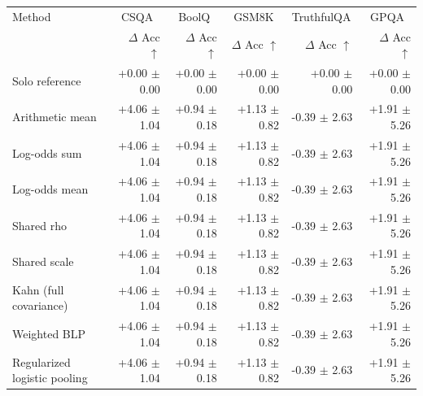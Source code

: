 \begin{tabular}{lrrrrr}
\toprule
Method & \multicolumn{1}{c}{CSQA} & \multicolumn{1}{c}{BoolQ} & \multicolumn{1}{c}{GSM8K} & \multicolumn{1}{c}{TruthfulQA} & \multicolumn{1}{c}{GPQA} \\
 & $\Delta$ Acc $\uparrow$ & $\Delta$ Acc $\uparrow$ & $\Delta$ Acc $\uparrow$ & $\Delta$ Acc $\uparrow$ & $\Delta$ Acc $\uparrow$ \\
\midrule
Solo reference & +0.00 {\scriptsize $\pm$ 0.00} & +0.00 {\scriptsize $\pm$ 0.00} & +0.00 {\scriptsize $\pm$ 0.00} & +0.00 {\scriptsize $\pm$ 0.00} & +0.00 {\scriptsize $\pm$ 0.00} \\
Arithmetic mean & +4.06 {\scriptsize $\pm$ 1.04} & +0.94 {\scriptsize $\pm$ 0.18} & +1.13 {\scriptsize $\pm$ 0.82} & -0.39 {\scriptsize $\pm$ 2.63} & +1.91 {\scriptsize $\pm$ 5.26} \\
Log-odds sum & +4.06 {\scriptsize $\pm$ 1.04} & +0.94 {\scriptsize $\pm$ 0.18} & +1.13 {\scriptsize $\pm$ 0.82} & -0.39 {\scriptsize $\pm$ 2.63} & +1.91 {\scriptsize $\pm$ 5.26} \\
Log-odds mean & +4.06 {\scriptsize $\pm$ 1.04} & +0.94 {\scriptsize $\pm$ 0.18} & +1.13 {\scriptsize $\pm$ 0.82} & -0.39 {\scriptsize $\pm$ 2.63} & +1.91 {\scriptsize $\pm$ 5.26} \\
Shared rho & +4.06 {\scriptsize $\pm$ 1.04} & +0.94 {\scriptsize $\pm$ 0.18} & +1.13 {\scriptsize $\pm$ 0.82} & -0.39 {\scriptsize $\pm$ 2.63} & +1.91 {\scriptsize $\pm$ 5.26} \\
Shared scale & +4.06 {\scriptsize $\pm$ 1.04} & +0.94 {\scriptsize $\pm$ 0.18} & +1.13 {\scriptsize $\pm$ 0.82} & -0.39 {\scriptsize $\pm$ 2.63} & +1.91 {\scriptsize $\pm$ 5.26} \\
Kahn (full covariance) & +4.06 {\scriptsize $\pm$ 1.04} & +0.94 {\scriptsize $\pm$ 0.18} & +1.13 {\scriptsize $\pm$ 0.82} & -0.39 {\scriptsize $\pm$ 2.63} & +1.91 {\scriptsize $\pm$ 5.26} \\
Weighted BLP & +4.06 {\scriptsize $\pm$ 1.04} & +0.94 {\scriptsize $\pm$ 0.18} & +1.13 {\scriptsize $\pm$ 0.82} & -0.39 {\scriptsize $\pm$ 2.63} & +1.91 {\scriptsize $\pm$ 5.26} \\
Regularized logistic pooling & +4.06 {\scriptsize $\pm$ 1.04} & +0.94 {\scriptsize $\pm$ 0.18} & +1.13 {\scriptsize $\pm$ 0.82} & -0.39 {\scriptsize $\pm$ 2.63} & +1.91 {\scriptsize $\pm$ 5.26} \\

\end{tabular}
